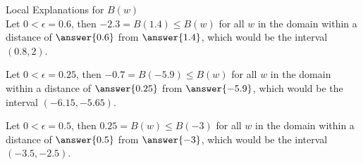 \documentclass{ximera}
\begin{document}
\begin{explanation}
Local Explanations for $B(w)$ \\

Let $0 < \epsilon = 0.6$, then   $-2.3 = B(1.4) \leq B(w)$ for all $w$ in the domain within a distance of $\answer{0.6}$ from $\answer{1.4}$, which would be the interval $(0.8, 2)$.

Let $0 < \epsilon = 0.25$, then   $-0.7 = B(-5.9) \leq B(w)$ for all $w$ in the domain within a distance of $\answer{0.25}$ from $\answer{-5.9}$, which would be the interval $(-6.15, -5.65)$.

Let $0 < \epsilon = 0.5$, then  $0.25 = B(w) \leq B(-3)$ for all $w$ in the domain within a distance of $\answer{0.5}$ from $\answer{-3}$, which would be the interval $(-3.5, -2.5)$.
\end{explanation}
\end{document}
